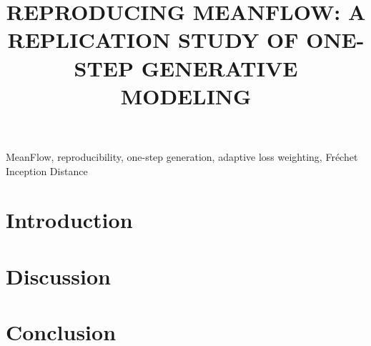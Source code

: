 \documentclass{article}
\title{
REPRODUCING MEANFLOW: A REPLICATION STUDY OF ONE-STEP GENERATIVE MODELING
}
\begin{document}
%
\maketitle
%
\begin{abstract}

\end{abstract}

\begin{keywords}
MeanFlow, reproducibility, one-step generation, adaptive loss weighting, Fr\'echet Inception Distance
\end{keywords}
%



\section{Introduction}


\clearpage

\clearpage

\section{Discussion}


\section{Conclusion}









\end{document}
